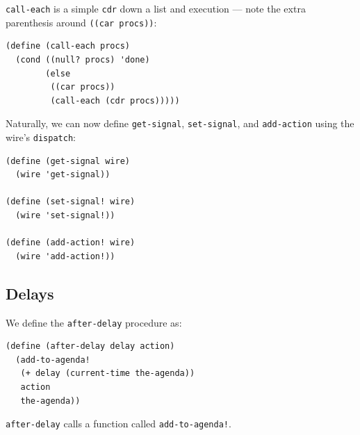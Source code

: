 \documentclass[9pt]{report}
\begin{document}
\texttt{call-each} is a simple \texttt{cdr} down a list and execution --- note the
extra parenthesis around \texttt{((car procs))}:

\begin{verbatim}
(define (call-each procs)
  (cond ((null? procs) 'done)
        (else
         ((car procs))
         (call-each (cdr procs)))))
\end{verbatim}

Naturally, we can now define \texttt{get-signal}, \texttt{set-signal}, and
\texttt{add-action} using the wire's \texttt{dispatch}:

\begin{verbatim}
(define (get-signal wire)
  (wire 'get-signal))

(define (set-signal! wire)
  (wire 'set-signal!))

(define (add-action! wire)
  (wire 'add-action!))
\end{verbatim}

\subsection{Delays}
\label{sec:orga2e2d8e}

We define the \texttt{after-delay} procedure as:

\begin{verbatim}
(define (after-delay delay action)
  (add-to-agenda!
   (+ delay (current-time the-agenda))
   action
   the-agenda))
\end{verbatim}

\texttt{after-delay} calls a function called \texttt{add-to-agenda!}.
\end{document}
